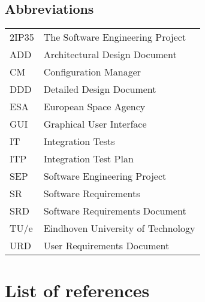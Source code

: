 
\subsection{Abbreviations}
\label{subsec:abbrev}
\begin{tabular}{l|l}
2IP35 & The Software Engineering Project \\
ADD & Architectural Design Document \\
CM    & Configuration Manager \\
DDD & Detailed Design Document \\
ESA & European Space Agency \\
GUI & Graphical User Interface \\
IT & Integration Tests \\
ITP & Integration Test Plan \\
SEP   & Software Engineering Project \\
SR    & Software Requirements \\
SRD   & Software Requirements Document \\
TU/e  & Eindhoven University of Technology \\
URD   & User Requirements Document \\
\end{tabular}


\section{List of references}
